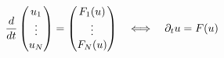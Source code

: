 \documentclass[preview]{standalone}
\begin{document}
\begin{align*}
\special{dvisvgm:raw <g id='unique000'>}\frac{d}{dt}\begin{pmatrix}u_1\\ \vdots\\ u_N\end{pmatrix} = \begin{pmatrix}F_1(u)\\ \vdots\\ F_N(u)\end{pmatrix}\quad\Longleftrightarrow\quad \partial_t u = F(u)\special{dvisvgm:raw </g>}
\end{align*}
\end{document}
